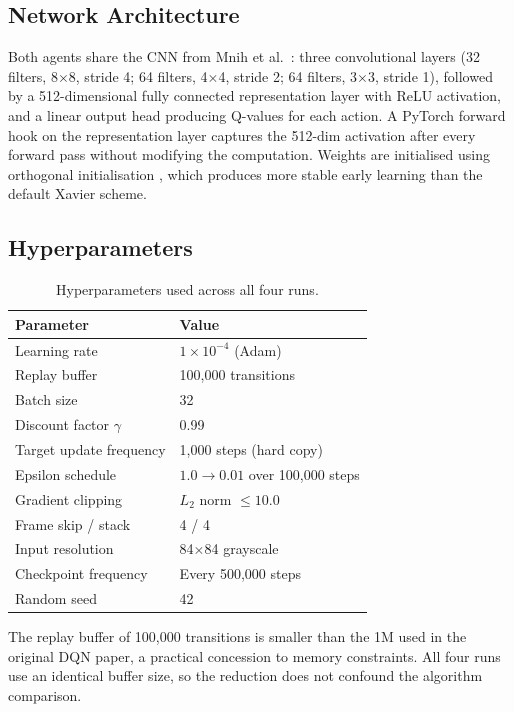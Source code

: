 \documentclass[a4paper]{article}
\begin{document}
\subsection{Network Architecture}

Both agents share the CNN from Mnih et al.\ \cite{mnih2015human}: three convolutional layers (32 filters, 8$\times$8, stride 4; 64 filters, 4$\times$4, stride 2; 64 filters, 3$\times$3, stride 1), followed by a 512-dimensional fully connected representation layer with ReLU activation, and a linear output head producing Q-values for each action. A PyTorch forward hook on the representation layer captures the 512-dim activation after every forward pass without modifying the computation. Weights are initialised using orthogonal initialisation \cite{saxe2013exact}, which produces more stable early learning than the default Xavier scheme.

\subsection{Hyperparameters}

\begin{table}[H]
\centering
\caption{Hyperparameters used across all four runs.}
\label{tab:hyperparams}
\begin{tabularx}{\linewidth}{lX}
\toprule
\textbf{Parameter} & \textbf{Value} \\
\midrule
Learning rate            & $1 \times 10^{-4}$ (Adam) \\
Replay buffer            & 100,000 transitions \\
Batch size               & 32 \\
Discount factor $\gamma$ & 0.99 \\
Target update frequency  & 1,000 steps (hard copy) \\
Epsilon schedule         & $1.0 \to 0.01$ over 100,000 steps \\
Gradient clipping        & $L_2$ norm $\leq 10.0$ \\
Frame skip / stack       & 4 / 4 \\
Input resolution         & 84$\times$84 grayscale \\
Checkpoint frequency     & Every 500,000 steps \\
Random seed              & 42 \\
\bottomrule
\end{tabularx}
\end{table}

The replay buffer of 100,000 transitions is smaller than the 1M used in the original DQN paper, a practical concession to memory constraints. All four runs use an identical buffer size, so the reduction does not confound the algorithm comparison.
\end{document}
